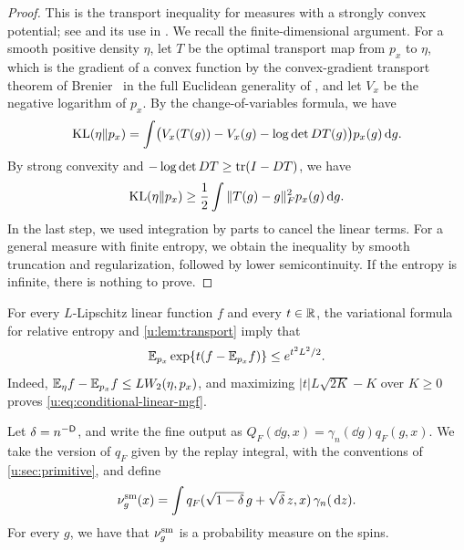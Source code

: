 \begin{proof}
This is the transport inequality for measures with a strongly convex potential; see
\cite[Corollary~3.10]{bogachev-kolesnikov-medvedev-2005} and its use in
\cite[Section~5]{oai-typical-upper}. We recall the finite-dimensional
argument. For a smooth positive density $\eta$, let $T$ be the optimal
transport map from $p_x$ to $\eta$, which is the gradient of a convex function
by the convex-gradient transport theorem of Brenier~\cite{brenier-1991}
in the full Euclidean generality of \cite[Main Theorem]{mccann-1995},
and let $V_x$ be the
negative logarithm of $p_x$. By the change-of-variables formula, we have
\[
 \operatorname{KL}(\eta\Vert p_x)
 =\int\bigl(V_x(T(g))-V_x(g)-\log\det DT(g)\bigr)p_x(g)\,\mathrm d g.
\]
By strong convexity and $-\log\det DT\ge\operatorname{tr}(I-DT)$, we have
\[
 \operatorname{KL}(\eta\Vert p_x)
 \ge\frac12\int\|T(g)-g\|_F^2p_x(g)\,\mathrm d g.
\]
In the last step, we used integration by parts to cancel the linear terms.
For a general measure with finite entropy, we obtain the inequality by smooth
truncation and regularization, followed by lower semicontinuity. If the
entropy is infinite, there is nothing to prove.
\end{proof}

For every $L$-Lipschitz linear function $f$ and every $t\in\mathbb R$, the variational formula for relative entropy
\cite[Corollary~4.14]{boucheron-lugosi-massart-2013} and \cref{u:lem:transport} imply that
\begin{equation}\label{u:eq:conditional-linear-mgf}
 \mathbb E_{p_x}\exp\{t(f-\mathbb E_{p_x}f)\}\le e^{t^2L^2/2}.
\end{equation}
Indeed, $\mathbb E_\eta f-\mathbb E_{p_x}f\le L W_2(\eta,p_x)$, and maximizing
$|t|L\sqrt{2K}-K$ over $K\ge0$ proves
\eqref{u:eq:conditional-linear-mgf}.

Let $\delta=n^{-\mathsf{D}}$, and write the fine output as
$Q_F(\dd g,x)=\gamma_n(\dd g)q_F(g,x)$. We take the version of $q_F$
given by the replay integral, with the conventions of
\cref{u:sec:primitive}, and define
\begin{equation}\label{u:eq:smoothed-kernel}
 \nu^{\rm sm}_g(x)=\int
 q_F(\sqrt{1-\delta}\,g+\sqrt\delta\,z,x)\,\gamma_n(\,\mathrm d z).
\end{equation}
For every $g$, we have that $\nu^{\rm sm}_g$ is a probability measure
on the spins.

